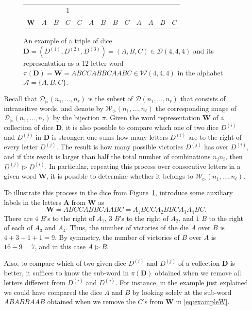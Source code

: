 \documentclass[reqno,a4paper,11pt]{amsart}
\newcommand{\btt}{\triangleright}
\theoremstyle{remark}
\newcommand{\mc}[1]{{\mathcal #1}}
\newcommand{\mb}[1]{{\mathbf #1}}
\numberwithin{equation}{section}
\begin{document}
\begin{figure}[!htb]
\begin{tabular}{m{0.35cm}m{0.35cm}m{0.35cm}m{0.35cm}m{0.35cm}m{0.35cm}m{0.35cm}m{0.35cm}m{0.35cm}m{0.35cm}m{0.35cm}m{0.35cm}m{0.35cm}}
                        \multicolumn{1}{c|}{}&
                        \multicolumn{1}{c|}{}&
                        \multicolumn{1}{c|}{}&
                        \multicolumn{1}{c|}{1}\\%
                        \multicolumn{1}{c||}{{$\mb W$}}&$A$&$B$&$C$&$C$&$A$&$B$&$B$&$C$&$A$&$A$&$B$&$C$
                    \end{tabular}
                    \caption{An example of a triple of dice $\mb D=(D^{(1)},D^{(2)},D^{(3)})=(A,B,C)\in \mc D(4,4,4)$ and its representation as a $12$-letter word $\pi(\mb D)=\mb W=ABCCABBCAABC\in \mc W(4,4,4)$ in the alphabet $\mc A=\{A,B,C\}$.}
                    \label{fig: dado vs string}
            \end{figure}

Recall that $\mc D_{\btt}(n_1,\hdots, n_\ell)$ is the subset of $\mc D(n_1,\hdots, n_\ell)$ that consists of intransitive words, and denote by $\mc W_\btt(n_1,\hdots, n_\ell)$ the corresponding image of $\mc D_\btt(n_1,\hdots, n_\ell)$ by the bijection $\pi$. Given the word representation $\mb W$ of a collection of dice $\mb D$, it is also possible to compare which one of two dice $D^{(i)}$ and $D^{(j)}$ in $\mb D$ is stronger: one sums how many letters $D^{(i)}$ are to the right of every letter $D^{(j)}$. The result is how many possible victories $D^{(j)}$ has over $D^{(i)}$, and if this result is larger than half the total number of combinations $n_jn_i$, then $D^{(j)} \btt D^{(i)}$. In particular, repeating this process over consecutive letters in a given word $\mb W$, it is possible to determine whether it belongs to $\mc W_\btt(n_1,\hdots, n_\ell)$.

To illustrate this process in the dice from Figure~\ref{fig: dado vs string}, introduce some auxiliary labels in the letters $\bm A$ from $\mb W$ as
%
\begin{equation}\label{eq:exampleW}
\mb W=ABCCABBCAABC=A_1BCCA_2BBCA_3A_4BC.
\end{equation}
%
There are $4$ $B$'s to the right of $A_1$, $3$ $B$'s to the right of $A_2$, and $1$ $B$ to the right of each of $A_3$ and $A_4$. Thus, the number of victories of the die $A$ over $B$ is $4+3+1+1=9$. By symmetry, the number of victories of $B$ over $A$ is $16-9=7$, and in this case $A\btt B$.

Also, to compare which of two given dice $D^{(i)}$ and $D^{(j)}$ of a collection $\mb D$ is better, it suffices to know the sub-word in $\pi(\mb D)$ obtained when we remove all letters different from $D^{(i)}$ and $D^{(j)}$. For instance, in the example just explained we could have compared the dice $A$ and $B$ by looking solely at the sub-word $ABABBAAB$ obtained when we remove the $C$'s from $\mb W$ in \eqref{eq:exampleW}.
\end{document}

